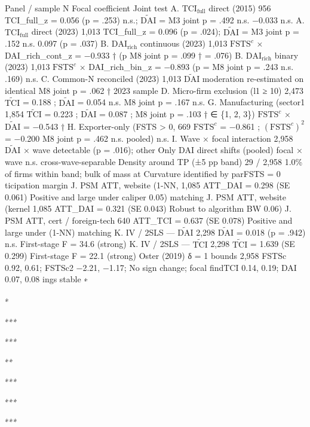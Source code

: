 \documentclass[12pt,a4paper]{article}
\begin{document}
Panel / sample N Focal coefficient Joint test A.
\(\mathrm{TCI}_{\text{full}}\) direct (2015) 956 TCI\_full\_z = 0.056 (p
= .253) n.s.; \(\tilde{\mathrm{DAI}}\) = M3 joint p = .492 n.s. −0.033
n.s. A. \(\mathrm{TCI}_{\text{full}}\) direct (2023) 1,013 TCI\_full\_z
= 0.096 (p = .024); \(\tilde{\mathrm{DAI}}\) = M3 joint p = .152 n.s.
0.097 (p = .037) B. \(\mathrm{DAI}_{\text{rich}}\) continuous (2023)
1,013 \(\mathrm{FSTS}^{c}\) × DAI\_rich\_cont\_z = −0.933 † (p M8 joint
p = .099 † = .076) B. \(\mathrm{DAI}_{\text{rich}}\) binary (2023) 1,013
\(\mathrm{FSTS}^{c}\) × DAI\_rich\_bin\_z = −0.893 (p = M8 joint p =
.243 n.s. .169) n.s. C. Common-N reconciled (2023) 1,013
\(\tilde{\mathrm{DAI}}\) moderation re-estimated on identical M8 joint p
= .062 † 2023 sample D. Micro-firm exclusion (l1 ≥ 10) 2,473
\(\tilde{\mathrm{TCI}}\) = 0.188 ; \(\tilde{\mathrm{DAI}}\) = 0.054 n.s.
M8 joint p = .167 n.s. G. Manufacturing (sector1 1,854
\(\tilde{\mathrm{TCI}}\) = 0.223 ; \(\tilde{\mathrm{DAI}}\) = 0.087 ; M8
joint p = .103 † ∈ \{1, 2, 3\}) \(\mathrm{FSTS}^{c}\) ×
\(\tilde{\mathrm{DAI}}\) = −0.543 † H. Exporter-only (FSTS
\textgreater{} 0, 669 \(\mathrm{FSTS}^{c}\) = −0.861 ;
\((\mathrm{FSTS}^{c})^2\) = −0.200 M8 joint p = .462 n.s. pooled) n.s.
I. Wave × focal interaction 2,958 \(\tilde{\mathrm{DAI}}\) × wave
detectable (p = .016); other Only DAI direct shifts (pooled) focal ×
wave n.s. cross-wave-separable Density around TP (±5 pp band) 29 / 2,958
1.0\% of firms within band; bulk of mass at Curvature identified by
parFSTS = 0 ticipation margin J. PSM ATT, website (1-NN, 1,085 ATT\_DAI
= 0.298 (SE 0.061) Positive and large under caliper 0.05) matching J.
PSM ATT, website (kernel 1,085 ATT\_DAI = 0.321 (SE 0.043) Robust to
algorithm BW 0.06) J. PSM ATT, cert / foreign-tech 640 ATT\_TCI = 0.637
(SE 0.078) Positive and large under (1-NN) matching K. IV / 2SLS ---
\(\tilde{\mathrm{DAI}}\) 2,298 \(\tilde{\mathrm{DAI}}\) = 0.018 (p =
.942) n.s. First-stage F = 34.6 (strong) K. IV / 2SLS ---
\(\tilde{\mathrm{TCI}}\) 2,298 \(\tilde{\mathrm{TCI}}\) = 1.639 (SE
0.299) First-stage F = 22.1 (strong) Oster (2019) δ = 1 bounds 2,958
FSTSc 0.92, 0.61; FSTSc2 −2.21, −1.17; No sign change; focal findTCI
0.14, 0.19; DAI 0.07, 0.08 ings stable ∗

∗

∗∗∗

∗∗∗

∗∗

∗∗∗

∗∗∗

∗∗∗
\end{document}
